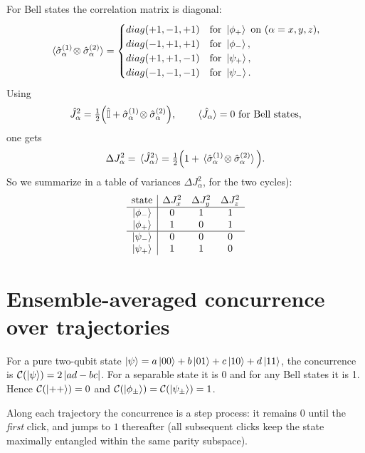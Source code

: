 \documentclass[12pt,a4paper]{article}
\begin{document}
	For Bell states the correlation matrix is diagonal:
	\[
	\expval*{\hat\sigma_\alpha^{(1)}\!\otimes \hat\sigma_\alpha^{(2)}}=
	\begin{cases}
		diag(+1, -1, +1) & \text{for }\ket{\phi_+}\ \text{on }(\alpha=x,y,z),\\
		diag(-1, +1, +1) & \text{for }\ket{\phi_-},\\
		diag(+1, +1, -1) & \text{for }\ket{\psi_+},\\
		diag(-1, -1, -1) & \text{for }\ket{\psi_-}.
	\end{cases}
	\]
	Using
	\[
	\hat J_\alpha^2=\tfrac{1}{2}\Big(\hat{\mathbb{I}}+\hat\sigma_\alpha^{(1)}\!\otimes \hat\sigma_\alpha^{(2)}\Big),
	\qquad \expval*{\hat J_\alpha}=0\ \text{for Bell states},
	\]
	one gets
	\[
	\Delta J_\alpha^2=\expval*{\hat J_\alpha^2}
	=\tfrac{1}{2}\Big(1+\expval*{\hat\sigma_\alpha^{(1)}\!\otimes \hat\sigma_\alpha^{(2)}}\Big).
	\]
	\medskip
	So we summarize in a table of variances \(\Delta J_\alpha^2\), for the two cycles):
	\[
	\begin{array}{c|ccc}
		\text{state} & \Delta J_x^2 & \Delta J_y^2 & \Delta J_z^2\\
		\hline
		\ket{\phi_-} & 0 & 1 & 1\\
		\ket{\phi_+} & 1 & 0 & 1\\
		\hline
		\ket{\psi_-} & 0 & 0 & 0\\
		\ket{\psi_+} & 1 & 1 & 0
	\end{array}
	\]	
	
	
	
	
	
	\section{Ensemble-averaged concurrence over trajectories}
	
	For a pure two-qubit state \(\ket{\psi}=a\ket{00}+b\ket{01}+c\ket{10}+d\ket{11}\),
	the concurrence is \(\mathcal{C}(\ket{\psi})=2\,\lvert ad-bc\rvert\). For a separable state it is 0 and for any Bell states it is 1.
	Hence \(\mathcal{C}(\ket{++})=0\) and \(\mathcal{C}(\ket{\phi_\pm})=\mathcal{C}(\ket{\psi_\pm})=1\).
	
	Along each trajectory the concurrence is a step process: it remains \(0\) until the \emph{first} click, and jumps to \(1\) thereafter (all subsequent clicks keep the state maximally entangled within the same parity subspace).
	
\end{document}
